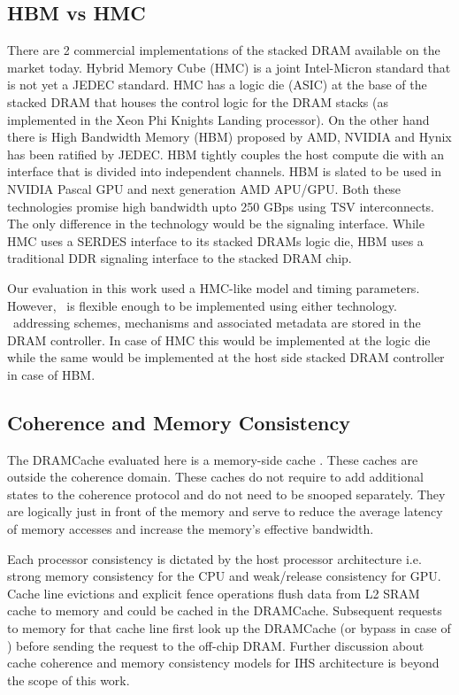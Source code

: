 \subsection{HBM vs HMC}
There are 2 commercial implementations of the stacked DRAM available on the market today. 
Hybrid Memory Cube (HMC) is a joint Intel-Micron standard that is not yet a JEDEC standard. 
HMC has a logic die (ASIC) at the base of the stacked DRAM that houses the control logic for the DRAM stacks (as implemented in the Xeon Phi Knights Landing processor\cite{xeonphi}). 
On the other hand there is High Bandwidth Memory (HBM) proposed by AMD, NVIDIA and Hynix has been ratified by JEDEC. 
HBM tightly couples the host compute die with an interface that is divided into independent channels.
HBM is slated to be used in NVIDIA Pascal GPU and next generation AMD APU/GPU.
Both these technologies promise high bandwidth upto 250 GBps using TSV interconnects. The only difference in the technology would be the signaling interface. While HMC uses a SERDES interface to its stacked DRAMs logic die, HBM uses a traditional DDR signaling interface to the stacked DRAM chip.
\par Our evaluation in this work used a HMC-like model and timing parameters. However, \cachename\ is flexible enough to be implemented using either technology. \cachename\ addressing schemes, mechanisms and associated metadata are stored in the DRAM controller. In case of HMC this would be implemented at the logic die while the same would be implemented at the host side stacked DRAM controller in case of HBM.

\subsection{Coherence and Memory Consistency} \label{discussion:coherence}
The DRAMCache evaluated here is a memory-side cache \cite{primer-coherence-consistency, mainak-hpca, skylake}.  These caches are outside the coherence domain. These caches do not require to add additional states to the coherence protocol and do not need to be snooped separately. They are logically just in front of the memory and serve to reduce the average latency of memory accesses and increase the memory's effective bandwidth.  
\par Each processor consistency is dictated by the host processor architecture i.e. strong memory consistency for the CPU and weak/release consistency for GPU. Cache line evictions and explicit fence operations flush data from L2 SRAM cache to memory and could be cached in the DRAMCache. Subsequent requests to memory for that cache line first look up the DRAMCache (or bypass in case of \bypassname) before sending the request to the off-chip DRAM. Further discussion about cache coherence and memory consistency models for IHS architecture is beyond the scope of this work.

